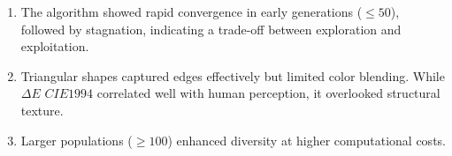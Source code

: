 \begin{enumerate}[partopsep=0pt,itemsep=0pt,leftmargin=0.4cm,label=\protect\circled{\arabic*}]
    \item The algorithm showed rapid convergence in early generations ($\leq 50$), followed by stagnation, indicating a trade-off between exploration and exploitation.
    \item Triangular shapes captured edges effectively but limited color blending. While $\Delta E\,\, CIE1994$ correlated well with human perception, it overlooked structural texture.
    \item Larger populations ($\geq 100$) enhanced diversity at higher computational costs.
\end{enumerate}
